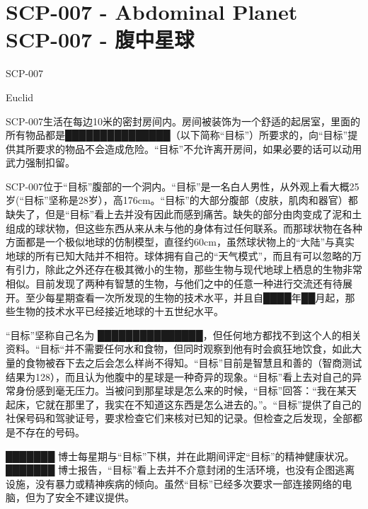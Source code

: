 \chapter[SCP-007 腹中星球]{
	SCP-007 - Abdominal Planet\\
	SCP-007 - 腹中星球
}

\label{chap:SCP-007}

SCP-007

Euclid

SCP-007生活在每边10米的密封房间内。房间被装饰为一个舒适的起居室，里面的所有物品都是███████████████（以下简称“目标”）所要求的，向“目标”提供其所要求的物品不会造成危险。“目标”不允许离开房间，如果必要的话可以动用武力强制扣留。

SCP-007位于“目标”腹部的一个洞内。“目标”是一名白人男性，从外观上看大概25岁(“目标”坚称是28岁），高176cm。“目标”的大部分腹部（皮肤，肌肉和器官）都缺失了，但是“目标”看上去并没有因此而感到痛苦。缺失的部分由肉变成了泥和土组成的球状物，但这些东西从来从未与他的身体有过任何联系。而那球状物在各种方面都是一个极似地球的仿制模型，直径约60cm，虽然球状物上的“大陆”与真实地球的所有已知大陆并不相符。球体拥有自己的“天气模式”，而且有可以忽略的万有引力，除此之外还存在极其微小的生物，那些生物与现代地球上栖息的生物非常相似。目前发现了两种有智慧的生物，与他们之中的任意一种进行交流还有待展开。至少每星期查看一次所发现的生物的技术水平，并且自████年██月起，那些生物的技术水平已经接近地球的十五世纪水平。

“目标”坚称自己名为 ███████████████，但任何地方都找不到这个人的相关资料。“目标“并不需要任何水和食物，但同时观察到他有时会疯狂地饮食，如此大量的食物被吞下去之后会怎么样尚不得知。“目标”目前是智慧且和善的（智商测试结果为128），而且认为他腹中的星球是一种奇异的现象。“目标”看上去对自己的异常身份感到毫无压力。当被问到那星球是怎么来的时候，“目标”回答：“我在某天起床，它就在那里了，我实在不知道这东西是怎么进去的。”。“目标”提供了自己的社保号码和驾驶证号，要求检查它们来核对已知的记录。但检查之后发现，全部都是不存在的号码。

███████ 博士每星期与“目标”下棋，并在此期间评定“目标”的精神健康状况。 ███████ 博士报告，“目标”看上去并不介意封闭的生活环境，也没有企图逃离设施，没有暴力或精神疾病的倾向。虽然“目标”已经多次要求一部连接网络的电脑，但为了安全不建议提供。
